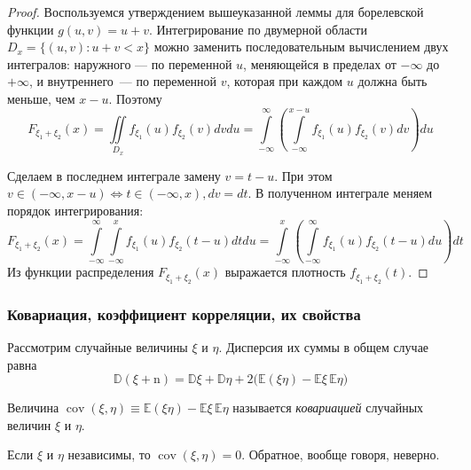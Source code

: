 \begin{proof}
    Воспользуемся утверждением вышеуказанной леммы для борелевской функции $g(u, v)=u+v$. 
    Интегрирование по двумерной области $D_{x}=\{(u, v) \colon u+v<x\}$ можно заменить последовательным вычислением двух интегралов: 
    наружного — по переменной $u$, меняющейся в пределах от $-\infty$ до $+\infty$, и внутреннего~--- по переменной $v$, которая при каждом $u$ должна быть меньше, чем $x-u$. 
    Поэтому
    \begin{equation*}
        F_{\xi_{1}+\xi_{2}}(x)=\iint\limits_{D_{x}} f_{\xi_{1}}(u) f_{\xi_{2}}(v) d v d u=\int\limits_{-\infty}^{\infty}\left(\int\limits_{-\infty}^{x-u} f_{\xi_{1}}(u) f_{\xi_{2}}(v) d v\right) d u
    \end{equation*}
    
    Сделаем в последнем интеграле замену $v=t-u$. При этом $v \in(-\infty, x-u) \Leftrightarrow t \in(-\infty, x), d v=d t$. 
    В полученном интеграле меняем порядок интегрирования:
    \begin{equation*}
        F_{\xi_{1}+\xi_{2}}(x)=\int\limits_{-\infty}^{\infty} \int\limits_{-\infty}^{x} f_{\xi_{1}}(u) f_{\xi_{2}}(t-u) d t d u=\int\limits_{-\infty}^{x}\left(\int\limits_{-\infty}^{\infty} f_{\xi_{1}}(u) f_{\xi_{2}}(t-u) d u\right) d t
    \end{equation*}
    Из функции распределения $F_{\xi_{1}+\xi_{2}}(x)$ выражается плотность $f_{\xi_{1}+\xi_{2}}(t)$.
\end{proof}

\subsubsection{Ковариация, коэффициент корреляции, их свойства}

Рассмотрим случайные величины $\xi$ и $\eta$. 
Дисперсия их суммы в общем случае равна
\begin{equation*}
    \mathbb{D}(\xi+\mathrm{n})=\mathbb{D} \xi+\mathbb{D} \eta + 2 \bigl( \mathbb{E}(\xi \eta)-\mathbb{E} \xi \, \mathbb{E} \eta \bigr)
\end{equation*}
\begin{defn}
    Величина $\operatorname{cov}(\xi, \eta) \equiv \mathbb{E}(\xi \eta)-\mathbb{E} \xi \, \mathbb{E} \eta$ называется \textit{ковариацией} случайных величин $\xi$ и $\eta$.
\end{defn}
Если $\xi$ и $\eta$ независимы, то $\operatorname{cov}(\xi, \eta) = 0$. 
Обратное, вообще говоря, неверно.

